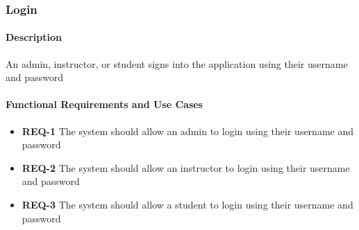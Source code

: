 \documentclass{article}
\begin{document}
\subsubsection{Login}

\paragraph{Description} An admin, instructor, or student signs into the application using their username and password

\paragraph{Functional Requirements and Use Cases}


\begin{itemize}
  \item \textbf{REQ-1} The system should allow an admin to login using their username and password
  \item \textbf{REQ-2} The system should allow an instructor to login using their username and password
  \item \textbf{REQ-3} The system should allow a student to login using their username and password
\end{itemize}


\vspace{0.1in}
\end{document}
